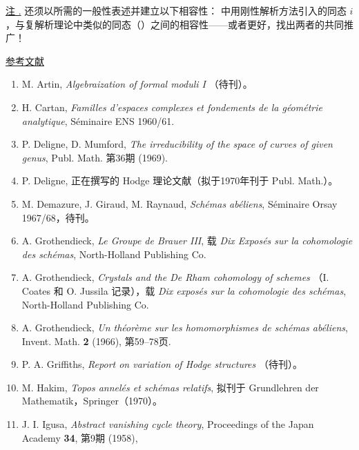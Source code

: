 \medskip
\noindent
\underline{注 .} 还须以所需的一般性表述并建立以下相容性： 中用刚性解析方法引入的同态 $i$，与复解析理论中类似的同态（）之间的相容性——或者更好，找出两者的共同推广！




\bigskip
\noindent\underline{参考文献}

\begin{enumerate}
\item[{[1]}] M. Artin, \emph{Algebraization of formal moduli I}
  （待刊）。
\item[{[2]}] H. Cartan, \emph{Familles d'espaces complexes et fondements
  de la g\'{e}om\'{e}trie analytique}, S\'{e}minaire ENS 1960/61.
\item[{[3]}] P. Deligne, D. Mumford, \emph{The irreducibility of the space
  of curves of given genus}, Publ. Math. 第36期 (1969).
\item[{[4]}] P. Deligne, 正在撰写的 Hodge 理论文献（拟于1970年刊于 Publ. Math.）。
\item[{[5]}] M. Demazure, J. Giraud, M. Raynaud, \emph{Sch\'{e}mas
  ab\'{e}liens}, S\'{e}minaire Orsay 1967/68，待刊。
\item[{[6]}] A. Grothendieck, \emph{Le Groupe de Brauer III}, 载
  \emph{Dix Expos\'{e}s sur la cohomologie des sch\'{e}mas}, North-Holland
  Publishing Co.
\item[{[7]}] A. Grothendieck, \emph{Crystals and the De Rham cohomology of
  schemes} （I. Coates 和 O. Jussila 记录），载 \emph{Dix expos\'{e}s
  sur la cohomologie des sch\'{e}mas}, North-Holland Publishing Co.
\item[{[8]}] A. Grothendieck, \emph{Un th\'{e}or\`{e}me sur les
  homomorphismes de sch\'{e}mas ab\'{e}liens}, Invent. Math. \textbf{2}
  (1966), 第59--78页.
\item[{[9]}] P. A. Griffiths, \emph{Report on variation of Hodge
  structures} （待刊）。
\item[{[10]}] M. Hakim, \emph{Topos annel\'{e}s et sch\'{e}mas relatifs},
  拟刊于 Grundlehren der Mathematik，Springer（1970）。
\item[{[11]}] J. I. Igusa, \emph{Abstract vanishing cycle theory},
  Proceedings of the Japan Academy \textbf{34}, 第9期 (1958),

\end{enumerate}

